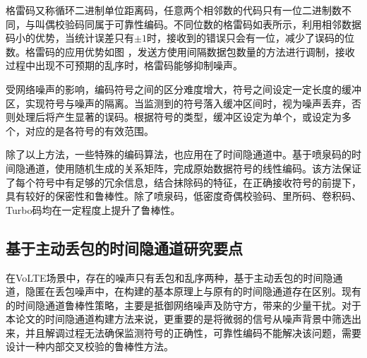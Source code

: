 格雷码又称循环二进制单位距离码，任意两个相邻数的代码只有一位二进制数不同，与叫偶校验码同属于可靠性编码。不同位数的格雷码如表所示，利用相邻数据码小的优势，当统计误差只有$\pm1$时，接收到的错误只会有一位，减少了误码的位数。格雷码的应用优势如图
，发送方使用间隔数据包数量的方法进行调制，接收过程中出现不可预期的乱序时，格雷码能够抑制噪声。

受网络噪声的影响，编码符号之间的区分难度增大，符号之间设定一定长度的缓冲区，实现符号与噪声的隔离。当监测到的符号落入缓冲区间时，视为噪声丢弃，否则处理后将产生显著的误码。根据符号的类型，缓冲区设定为单个，或设定为多个，对应的是各符号的有效范围。

除了以上方法，一些特殊的编码算法，也应用在了时间隐通道中。基于喷泉码的时间隐通道，使用随机生成的关系矩阵，完成原始数据符号的线性编码。该方法保证了每个符号中有足够的冗余信息，结合抹除码的特征，在正确接收符号的前提下，具有较好的保密性和鲁棒性。除了喷泉码，低密度奇偶校验码、里所码、卷积码、Turbo码均在一定程度上提升了鲁棒性。

\subsection{基于主动丢包的时间隐通道研究要点}
在VoLTE场景中，存在的噪声只有丢包和乱序两种，基于主动丢包的时间隐通道，隐匿在丢包噪声中，在构建的基本原理上与原有的时间隐通道存在区别。现有的时间隐通道鲁棒性策略，主要是抵御网络噪声及防守方，带来的少量干扰。对于本论文的时间隐通道构建方法来说，更重要的是将微弱的信号从噪声背景中筛选出来，并且解调过程无法确保监测符号的正确性，可靠性编码不能解决该问题，需要设计一种内部交叉校验的鲁棒性方法。
